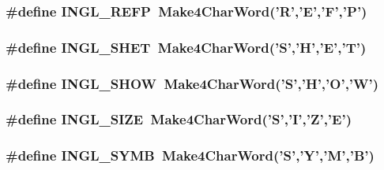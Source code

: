 \hypertarget{a00216_adf451f94f0842262619c0b3312ba95c4}{
\subsubsection[{I\-N\-G\-L\-\_\-\-R\-E\-F\-P}]{\setlength{\rightskip}{0pt plus 5cm}\#define I\-N\-G\-L\-\_\-\-R\-E\-F\-P~{\bf Make4\-Char\-Word}('R','E','F','P')}}\label{a00216_adf451f94f0842262619c0b3312ba95c4}
\hypertarget{a00216_a0aa6ebb8325caf7ad620ad870d29daf0}{
\subsubsection[{I\-N\-G\-L\-\_\-\-S\-H\-E\-T}]{\setlength{\rightskip}{0pt plus 5cm}\#define I\-N\-G\-L\-\_\-\-S\-H\-E\-T~{\bf Make4\-Char\-Word}('S','H','E','T')}}\label{a00216_a0aa6ebb8325caf7ad620ad870d29daf0}
\hypertarget{a00216_a2fd31b6c08a9e4b5160638340538c735}{
\subsubsection[{I\-N\-G\-L\-\_\-\-S\-H\-O\-W}]{\setlength{\rightskip}{0pt plus 5cm}\#define I\-N\-G\-L\-\_\-\-S\-H\-O\-W~{\bf Make4\-Char\-Word}('S','H','O','W')}}\label{a00216_a2fd31b6c08a9e4b5160638340538c735}
\hypertarget{a00216_a2d6437954c828f47d6b46372ab4f7fa0}{
\subsubsection[{I\-N\-G\-L\-\_\-\-S\-I\-Z\-E}]{\setlength{\rightskip}{0pt plus 5cm}\#define I\-N\-G\-L\-\_\-\-S\-I\-Z\-E~{\bf Make4\-Char\-Word}('S','I','Z','E')}}\label{a00216_a2d6437954c828f47d6b46372ab4f7fa0}
\hypertarget{a00216_ab191567257aa36e2d8b2b672d9e5e6f8}{
\subsubsection[{I\-N\-G\-L\-\_\-\-S\-Y\-M\-B}]{\setlength{\rightskip}{0pt plus 5cm}\#define I\-N\-G\-L\-\_\-\-S\-Y\-M\-B~{\bf Make4\-Char\-Word}('S','Y','M','B')}}\label{a00216_ab191567257aa36e2d8b2b672d9e5e6f8}
